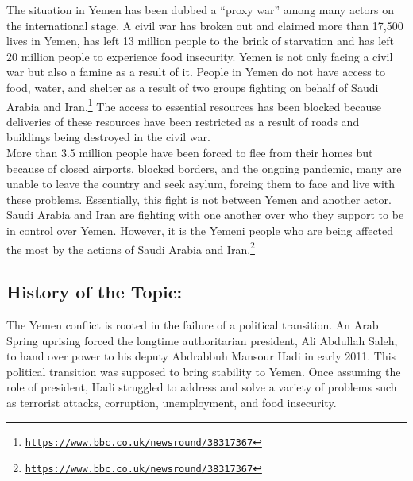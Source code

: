 \documentclass[10pt, letterpaper]{article}
\begin{document}
The situation in Yemen has been dubbed a ``proxy war'' among many actors
on the international stage. A civil war has broken out and claimed more
than 17,500 lives in Yemen, has left 13 million people to the brink of
starvation and has left 20 million people to experience food insecurity.
Yemen is not only facing a civil war but also a famine as a result of
it. People in Yemen do not have access to food, water, and shelter as a
result of two groups fighting on behalf of Saudi Arabia and
Iran.\footnote{\texttt{\href{https://www.bbc.co.uk/newsround/38317367}{{https://www.bbc.co.uk/newsround/38317367}}}}
The access to essential resources has been blocked because deliveries of
these resources have been restricted as a result of roads and buildings
being destroyed in the civil war. \\

More than 3.5 million people have been forced to flee from their homes
but because of closed airports, blocked borders, and the ongoing
pandemic, many are unable to leave the country and seek asylum, forcing
them to face and live with these problems. Essentially, this fight is
not between Yemen and another actor. Saudi Arabia and Iran are fighting
with one another over who they support to be in control over Yemen.
However, it is the Yemeni people who are being affected the most by the
actions of Saudi Arabia and Iran.\footnote{\texttt{\href{https://www.bbc.co.uk/newsround/38317367}{{https://www.bbc.co.uk/newsround/38317367}}}} \\

\subsection{History of the Topic:}

The Yemen conflict is rooted in the failure of a political transition.
An Arab Spring uprising forced the longtime authoritarian president, Ali
Abdullah Saleh, to hand over power to his deputy Abdrabbuh Mansour Hadi
in early 2011. This political transition was supposed to bring stability
to Yemen. Once assuming the role of president, Hadi struggled to address
and solve a variety of problems such as terrorist attacks, corruption,
unemployment, and food insecurity. \\
\end{document}
